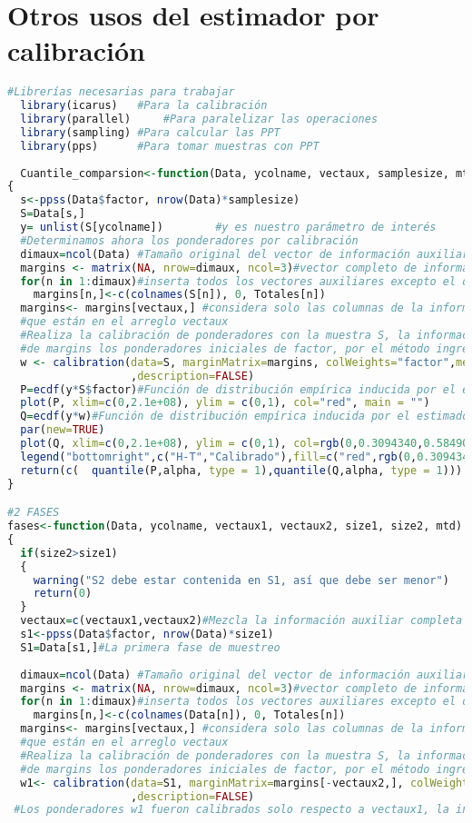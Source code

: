 \documentclass[a4paper,twoside,openright,12pt]{book}
\theoremstyle{definition}
\numberwithin{equation}{chapter}
\numberwithin{figure}{chapter}
\numberwithin{table}{chapter}
\numberwithin{theorem}{chapter}
\numberwithin{lemma}{chapter}
\begin{document}
\chapter{Otros usos del estimador por calibración}\label{anx:g}
\begin{lstlisting}[language=R]
	#Librerías necesarias para trabajar
  library(icarus)	#Para la calibración
  library(parallel) 	#Para paralelizar las operaciones
  library(sampling)	#Para calcular las PPT
  library(pps)		#Para tomar muestras con PPT
  
  Cuantile_comparsion<-function(Data, ycolname, vectaux, samplesize, mtd, alpha)
{
  s<-ppss(Data$factor, nrow(Data)*samplesize)
  S=Data[s,]
  y= unlist(S[ycolname])        #y es nuestro parámetro de interés
  #Determinamos ahora los ponderadores por calibración
  dimaux=ncol(Data) #Tamaño original del vector de información auxiliar
  margins <- matrix(NA, nrow=dimaux, ncol=3)#vector completo de información auxiliar
  for(n in 1:dimaux)#inserta todos los vectores auxiliares excepto el de los factores de exp.
    margins[n,]<-c(colnames(S[n]), 0, Totales[n])
  margins<- margins[vectaux,] #considera solo las columnas de la información auxiliar
  #que están en el arreglo vectaux
  #Realiza la calibración de ponderadores con la muestra S, la información auxiliar
  #de margins los ponderadores iniciales de factor, por el método ingresado mtd
  w <- calibration(data=S, marginMatrix=margins, colWeights="factor",method=mtd
                   ,description=FALSE)
  P=ecdf(y*S$factor)#Función de distribución empírica inducida por el estimador de H-T
  plot(P, xlim=c(0,2.1e+08), ylim = c(0,1), col="red", main = "")
  Q=ecdf(y*w)#Función de distribución empírica inducida por el estimador por calibración
  par(new=TRUE)
  plot(Q, xlim=c(0,2.1e+08), ylim = c(0,1), col=rgb(0,0.3094340,0.5849057) ,main = "Distribuciones empíricas")#
  legend("bottomright",c("H-T","Calibrado"),fill=c("red",rgb(0,0.3094340,0.5849057)))
  return(c(  quantile(P,alpha, type = 1),quantile(Q,alpha, type = 1)))
}

#2 FASES
fases<-function(Data, ycolname, vectaux1, vectaux2, size1, size2, mtd)
{
  if(size2>size1)
  {
    warning("S2 debe estar contenida en S1, así que debe ser menor")
    return(0)
  }
  vectaux=c(vectaux1,vectaux2)#Mezcla la información auxiliar completa
  s1<-ppss(Data$factor, nrow(Data)*size1)
  S1=Data[s1,]#La primera fase de muestreo
  
  dimaux=ncol(Data) #Tamaño original del vector de información auxiliar
  margins <- matrix(NA, nrow=dimaux, ncol=3)#vector completo de información auxiliar
  for(n in 1:dimaux)#inserta todos los vectores auxiliares excepto el de los factores de exp.
    margins[n,]<-c(colnames(Data[n]), 0, Totales[n])
  margins<- margins[vectaux,] #considera solo las columnas de la información auxiliar
  #que están en el arreglo vectaux
  #Realiza la calibración de ponderadores con la muestra S, la información auxiliar
  #de margins los ponderadores iniciales de factor, por el método ingresado mtd
  w1<- calibration(data=S1, marginMatrix=margins[-vectaux2,], colWeights="factor",method=mtd
                   ,description=FALSE)
 #Los ponderadores w1 fueron calibrados solo respecto a vectaux1, la información obtenida en la primera fase de muestreo.


\end{lstlisting}
\end{document}
